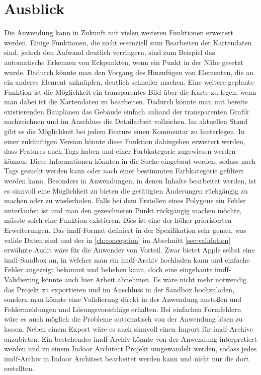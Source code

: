 \section{Ausblick}
Die Anwendung kann in Zukunft mit vielen weiteren Funktionen erweitert werden.
Einige Funktionen, die nicht essenziell zum Bearbeiten der Kartendaten sind, jedoch den Aufwand deutlich verringern, sind zum Beispiel das automatische Erkennen von Eckpunkten, wenn ein Punkt in der Nähe gesetzt wurde.
Dadurch könnte man den Vorgang des Hinzufügen von Elementen, die an ein anderes Element anknüpfen, deutlich schneller machen.\pbreak
%
Eine weitere geplante Funktion ist die Möglichkeit ein transparentes Bild über die Karte zu legen, wenn man dabei ist die Kartendaten zu bearbeiten.
Dadurch könnte man mit bereits existierenden Bauplänen das Gebäude einfach anhand der transparenten Grafik nachzeichnen und im Anschluss die Detailarbeit vollziehen.\pbreak%
%
Im aktuellen Stand gibt es die Möglichkeit bei jedem Feature einen Kommentar zu hinterlegen.
In einer zukünftigen Version könnte diese Funktion dahingehen erweitert werden, dass Features auch Tags haben und einer Farbkategorie zugewiesen werden können.
Diese Informationen könnten in die Suche eingebaut werden, sodass nach Tags gesucht werden kann oder nach einer bestimmten Farbkategorie gefiltert werden kann.\pbreak%
%
Besonders in Anwendungen, in denen Inhalte bearbeitet werden, ist es sinnvoll eine Möglichkeit zu bieten die getätigten Änderungen rückgängig zu machen oder zu wiederholen.
Falls bei dem Erstellen eines Polygons ein Fehler unterlaufen ist und man den gezeichneten Punkt rückgängig machen möchte, müsste solch eine Funktion existieren.
Dies ist eine der höher priorisierten Erweiterungen.\pbreak%
%
Das \ac{imdf}-Format definiert in der Spezifikation sehr genau, was valide Daten sind und der in \autoref{ch:conception} im Abschnitt \autoref{sec:validation} erwähnte Audit wäre für die Anwender von Vorteil.
Zwar bietet Apple selbst eine \ac{imdf}-Sandbox an, in welcher man ein \ac{imdf}-Archiv hochladen kann und einfache Fehler angezeigt bekommt und beheben kann, doch eine eingebaute \ac{imdf}-Validierung könnte auch hier Arbeit abnehmen.
Es wäre nicht mehr notwendig das Projekt zu exportieren und im Anschluss in der Sandbox hochzuladen, sondern man könnte eine Validierung direkt in der Anwendung anstoßen und Fehlermeldungen und Lösungsvorschläge erhalten.
Bei einfachen Formfehlern wäre es auch möglich die Probleme automatisch von der Anwendung lösen zu lassen.\pbreak%
%
Neben einem Export wäre es auch sinnvoll einen Import für \ac{imdf}-Archive anzubieten.
Ein bestehendes \ac{imdf}-Archiv könnte von der Anwendung interpretiert werden und zu einem Indoor Architect Projekt umgewandelt werden, sodass jedes \ac{imdf}-Archiv in Indoor Architect bearbeitet werden kann und nicht nur die dort erstellten.
